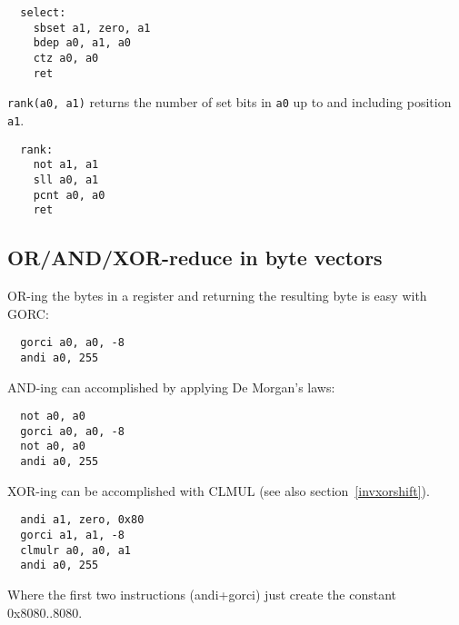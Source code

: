\begin{minipage}{\linewidth}
\begin{verbatim}
  select:
    sbset a1, zero, a1
    bdep a0, a1, a0
    ctz a0, a0
    ret
\end{verbatim}
\end{minipage}

\texttt{rank(a0, a1)} returns the number of set bits in \texttt{a0} up to and
including position \texttt{a1}.

\begin{minipage}{\linewidth}
\begin{verbatim}
  rank:
    not a1, a1
    sll a0, a1
    pcnt a0, a0
    ret
\end{verbatim}
\end{minipage}


\subsection{OR/AND/XOR-reduce in byte vectors}

OR-ing the bytes in a register and returning the resulting byte is
easy with GORC:

\begin{minipage}{\linewidth}
\begin{verbatim}
  gorci a0, a0, -8
  andi a0, 255
\end{verbatim}
\end{minipage}

AND-ing can accomplished by applying De Morgan's laws:

\begin{minipage}{\linewidth}
\begin{verbatim}
  not a0, a0
  gorci a0, a0, -8
  not a0, a0
  andi a0, 255
\end{verbatim}
\end{minipage}

XOR-ing can be accomplished with CLMUL (see also section~\ref{invxorshift}).

\begin{minipage}{\linewidth}
\begin{verbatim}
  andi a1, zero, 0x80
  gorci a1, a1, -8
  clmulr a0, a0, a1
  andi a0, 255
\end{verbatim}
\end{minipage}

Where the first two instructions (andi+gorci) just create the constant 0x8080..8080.

